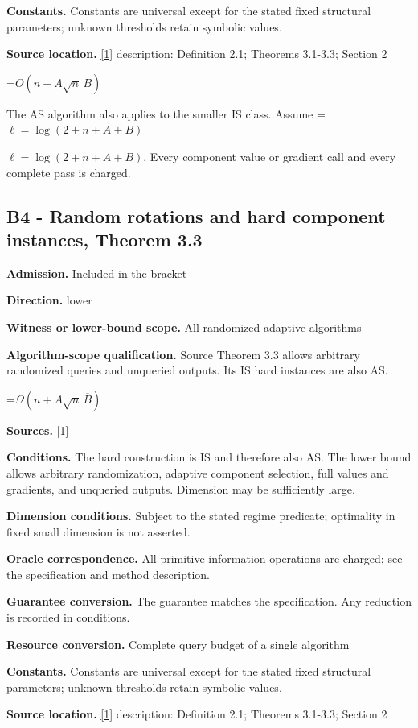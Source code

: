 \documentclass[10pt,a4paper]{article}
\newcommand{\AtlasMath}[1]{\par\begingroup\centering\setbox0=\hbox{$\displaystyle #1$}\ifdim\wd0>1.4\linewidth\typeout{ATLAS WIDE FORMULA: \the\wd0}\fi\ifdim\wd0>\linewidth\resizebox{\linewidth}{!}{\box0}\else\box0\fi\par\endgroup}
\newcommand{\AtlasInlineMath}[1]{\begingroup\setbox0=\hbox{$#1$}\ifdim\wd0>.4\linewidth\endgroup\AtlasMath{#1}\else\endgroup$#1$\fi}
\begin{document}
\textbf{Constants.} Constants are universal except for the stated fixed structural parameters; unknown thresholds retain symbolic values.

\textbf{Source location.} \href{https://arxiv.org/pdf/2610.16991v2}{[1]} description: Definition 2.1; Theorems 3.1-3.3; Section 2

\AtlasMath{O(n+A\sqrt n\,\overline B)}
The AS algorithm also applies to the smaller IS class. Assume \AtlasInlineMath{\ell=\log(2+n+A+B)}. Every component value or gradient call and every complete pass is charged.

\subsection{B4 - Random rotations and hard component instances, Theorem 3.3}
\textbf{Admission.} Included in the bracket

\textbf{Direction.} lower

\textbf{Witness or lower-bound scope.} All randomized adaptive algorithms

\textbf{Algorithm-scope qualification.} Source Theorem 3.3 allows arbitrary randomized queries and unqueried outputs. Its IS hard instances are also AS.

\AtlasMath{\Omega(n+A\sqrt n\,\overline B)}
\textbf{Sources.} \href{https://arxiv.org/pdf/2610.16991v2}{[1]}

\textbf{Conditions.} The hard construction is IS and therefore also AS. The lower bound allows arbitrary randomization, adaptive component selection, full values and gradients, and unqueried outputs. Dimension may be sufficiently large.

\textbf{Dimension conditions.} Subject to the stated regime predicate; optimality in fixed small dimension is not asserted.

\textbf{Oracle correspondence.} All primitive information operations are charged; see the specification and method description.

\textbf{Guarantee conversion.} The guarantee matches the specification. Any reduction is recorded in conditions.

\textbf{Resource conversion.} Complete query budget of a single algorithm

\textbf{Constants.} Constants are universal except for the stated fixed structural parameters; unknown thresholds retain symbolic values.

\textbf{Source location.} \href{https://arxiv.org/pdf/2610.16991v2}{[1]} description: Definition 2.1; Theorems 3.1-3.3; Section 2
\end{document}
